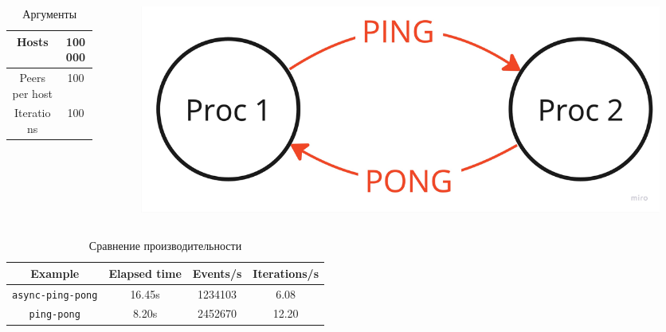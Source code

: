 \documentclass[t]{beamer}  %
\begin{document}
 \begin{frame}[fragile]
	\frametitle{\insertsection} 
	\framesubtitle{\insertsubsection}

	\begin{columns}
		\begin{column}[t]{0.3\linewidth}
			\small
			\begin{table}[H]
				\centering
				\begin{tabular}{|c|c|}
					\hline
					Hosts & 100000 \\
					\hline
					Peers per host &  100\\
					\hline
					Iterations & 100 \\ 
					\hline
				\end{tabular}
			\caption*{\hspace{1cm}Аргументы}
			\end{table}
		\end{column}
		\begin{column}[t]{0.6\linewidth}
			\begin{figure}[H]
				\centering
				\includegraphics[width=0.8\linewidth]{images/ping_pong_scheme}
			\end{figure}
		\end{column}
	\end{columns}
	
	\begin{table}[H]
		\centering
		\begin{tabular}{|c|c|c|c|}
			\hline
			Example & Elapsed time & Events/s & Iterations/s \\
			\hline
			\texttt{async-ping-pong} & 16.45s & 1234103 & 6.08\\
			\hline
			\texttt{ping-pong} &  8.20s & 2452670 & 12.20\\
			\hline
		\end{tabular}
		\caption*{Сравнение производительности}
	\end{table}
 \end{frame}
\end{document}
